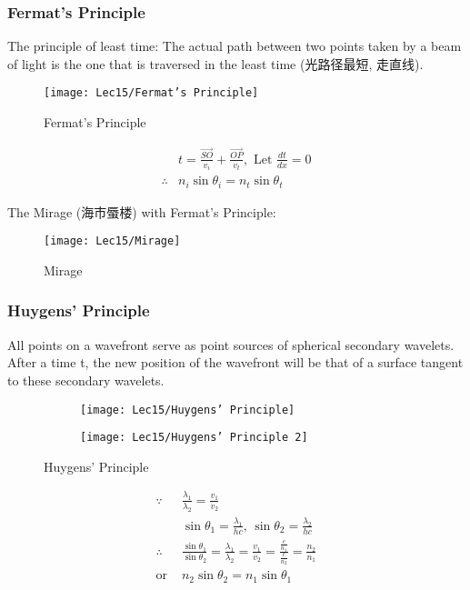 \subsubsection{Fermat's Principle}
The principle of least time: The actual path between two points taken by a beam of light is the one that is traversed in the least time (光路径最短, 走直线). 

\begin{figure}[H]
    \centering
    \texttt{[image: Lec15/Fermat's Principle]}
    \caption{Fermat's Principle}
\end{figure}

\begin{align*}
    &t=\frac{\overrightarrow{SO }}{v_i }+\frac{\overrightarrow{OP }}{v_t }, \text{ Let } \frac{dt }{dx }=0\\
    \therefore& n_i\sin \theta_i = n_t \sin \theta_t
\end{align*}

The Mirage (海市蜃楼) with Fermat’s Principle: 
\begin{figure}[H]
    \centering
    \texttt{[image: Lec15/Mirage]}
    \caption{Mirage}
\end{figure}

\subsubsection{Huygens' Principle}
All points on a wavefront serve as point sources of spherical secondary wavelets. After a time t, the new position of the wavefront will be that of a surface tangent to these secondary wavelets. 

\begin{figure}[H]
    \centering
    \begin{subfigure}{0.155\textwidth}
        \centering
        \texttt{[image: Lec15/Huygens' Principle]}
    \end{subfigure}
    \begin{subfigure}{0.31\textwidth}
        \centering
        \texttt{[image: Lec15/Huygens' Principle 2]}
    \end{subfigure}
    \caption{Huygens' Principle}
\end{figure}
 
\begin{align*}
    \because \, &\frac{\lambda_1}{\lambda_2}=\frac{v_1}{v_2}\\
    & \sin \theta_1=\frac{\lambda_1}{hc}, \, \sin\theta_2=\frac{\lambda_2}{hc}\\
    \therefore \, & \frac{\sin \theta_1}{\sin \theta_2}=\frac{\lambda_1}{\lambda_2}=\frac{v_1}{v_2}=\frac{\frac{c }{n_1 }}{\frac{c }{n_2 }}=\frac{n_2 }{n_1}\\
    \text{or }& n_2\sin\theta_2=n_1\sin\theta_1
\end{align*}

